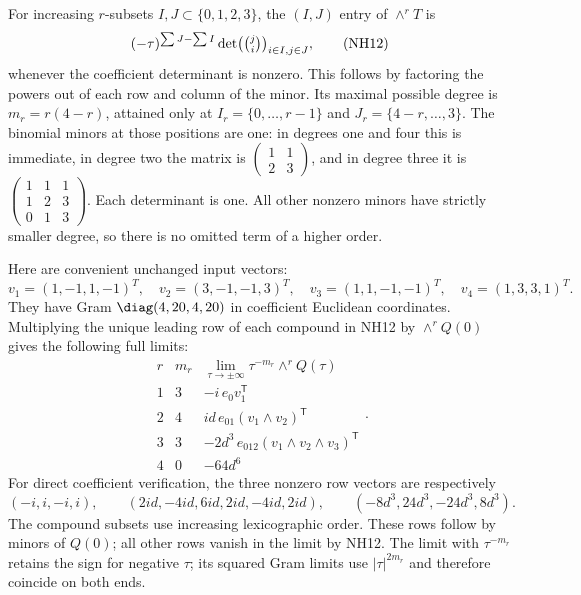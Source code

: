 For increasing $r$-subsets $I,J\subset\{0,1,2,3\}$, the
$(I,J)$ entry of $\wedge^rT$ is
\[
 (-\tau)^{\sum J-\sum I}
       \det\bigl(\tbinom j i\bigr)_{i\in I,j\in J},
 \tag{NH12}
\]
whenever the coefficient determinant is nonzero. This follows
by factoring the powers out of each row and column of the
minor. Its maximal possible degree is
$m_r=r(4-r)$, attained only at
$I_r=\{0,\ldots,r-1\}$ and $J_r=\{4-r,\ldots,3\}$.
The binomial minors at those positions are one: in degrees
one and four this is immediate, in degree two the matrix is
$\left(\begin{smallmatrix}1&1\\2&3\end{smallmatrix}\right)$,
and in degree three it is
$\left(\begin{smallmatrix}1&1&1\\1&2&3\\0&1&3\end{smallmatrix}\right)$.
Each determinant is one. All other nonzero minors have strictly
smaller degree, so there is no omitted term of a higher order.

Here are convenient unchanged input vectors:
\[
 v_1=(1,-1,1,-1)^T,\quad v_2=(3,-1,-1,3)^T,\quad
 v_3=(1,1,-1,-1)^T,\quad v_4=(1,3,3,1)^T.
 \tag{NH13}
\]
They have Gram $\diag(4,20,4,20)$ in coefficient Euclidean
coordinates. Multiplying the unique leading row of each compound
in NH12 by $\wedge^rQ(0)$ gives the following full limits:
\[
\begin{array}{c|c|c}
 r&m_r&\lim_{\tau\to\pm\infty}\tau^{-m_r}\wedge^rQ(\tau)\\\hline
 1&3&-i\,e_0v_1^{\mathsf T}\\
 2&4&id\,e_{01}(v_1\wedge v_2)^{\mathsf T}\\
 3&3&-2d^3\,e_{012}(v_1\wedge v_2\wedge v_3)^{\mathsf T}\\
 4&0&-64d^6
\end{array}.
\tag{NH14}
\]
For direct coefficient verification, the three nonzero row
vectors are respectively
\[
 (-i,i,-i,i),\qquad
 (2id,-4id,6id,2id,-4id,2id),\qquad
 (-8d^3,24d^3,-24d^3,8d^3).
\]
The compound subsets use increasing lexicographic order. These
rows follow by minors of $Q(0)$; all other rows vanish in the
limit by NH12. The limit with $\tau^{-m_r}$ retains the sign
for negative $\tau$; its squared Gram limits use $|\tau|^{2m_r}$
and therefore coincide on both ends.


